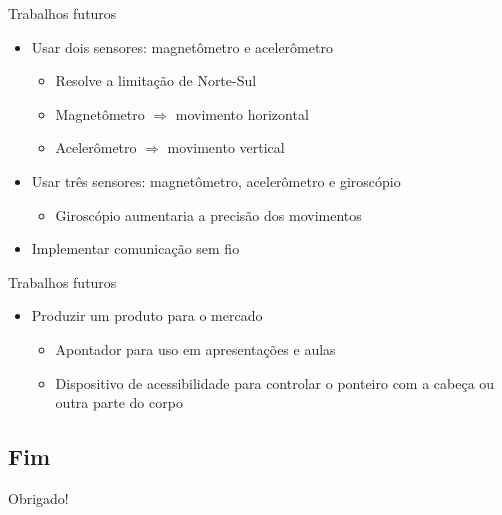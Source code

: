 \documentclass{beamer}
\begin{document}
\begin{frame}{Trabalhos futuros}
	\begin{itemize}
	\pause
	\item Usar dois sensores: magnetômetro e acelerômetro
		\begin{itemize}
		\pause
		\item Resolve a limitação de Norte-Sul
		\pause
		\item Magnetômetro $\Longrightarrow$ movimento horizontal
		\item Acelerômetro $\Longrightarrow$ movimento vertical
		\end{itemize}
	\pause
	\item Usar três sensores: magnetômetro, acelerômetro e giroscópio
		\begin{itemize}
		\pause
		\item Giroscópio aumentaria a precisão dos movimentos
		\end{itemize}
	\pause
	\item Implementar comunicação sem fio
	\end{itemize}
\end{frame}

\begin{frame}{Trabalhos futuros}
	\begin{itemize}
	\pause
	\item Produzir um produto para o mercado
		\begin{itemize}
		\pause
		\item Apontador para uso em apresentações e aulas
		\pause
		\item Dispositivo de acessibilidade para controlar o ponteiro com a cabeça ou outra parte do corpo
		\end{itemize}
	\end{itemize}
\end{frame}


\subsection{Fim}

\begin{frame}{}
	\begin{center}
	\Large{Obrigado!}
	\end{center}
\end{frame}
\end{document}

